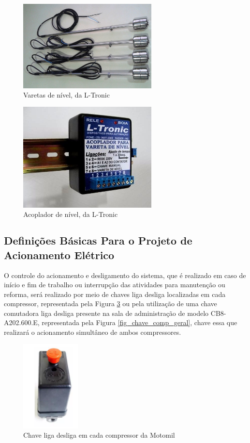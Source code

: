 \documentclass[10pt,a4paper]{article}
\begin{document}
\begin{figure}[t]
    \centering
    \includegraphics[width=7cm]{Figuras/varetas.jpg}
    \caption{Varetas de nível, da L-Tronic}
    \label{varetas}
\end{figure}

\begin{figure}[H]
    \centering
    \includegraphics[width=7cm]{Figuras/acoplador.jpg}
    \caption{Acoplador de nível, da L-Tronic}
    \label{acoplador}
\end{figure}

\subsection{{Definições Básicas Para o Projeto de Acionamento Elétrico}}

O controle do acionamento e desligamento do sistema, que é realizado em caso de início e fim de trabalho ou interrupção das atividades para manutenção ou reforma, será realizado por meio de chaves liga desliga localizadas em cada compressor, representada pela Figura \ref{fig_chave_compressor} ou pela utilização de uma chave comutadora liga desliga presente na sala de administração de modelo CB8-A202.600.E, representada pela Figura \ref{fig_chave_comp_geral}, chave essa que realizará o acionamento simultâneo de ambos compressores.

\begin{figure}[H]
    \centering
    \includegraphics[width=3cm]{Figuras/fig_chave_compressor.PNG}
    \caption{Chave liga desliga em cada compressor da Motomil}
    \label{fig_chave_compressor}
\end{figure}
\end{document}

